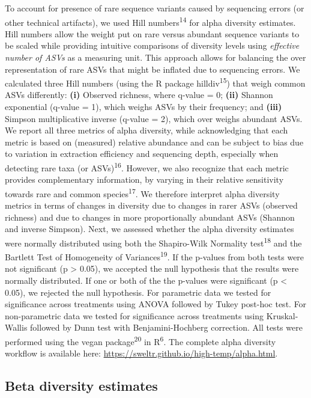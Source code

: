 \documentclass[
  10pt,
  letterpaper,
  DIV=11,
  numbers=noendperiod]{scrartcl}
\begin{document}
To account for presence of rare sequence variants caused by sequencing
errors (or other technical artifacts), we used Hill
numbers\textsuperscript{14} for alpha diversity estimates. Hill numbers
allow the weight put on rare versus abundant sequence variants to be
scaled while providing intuitive comparisons of diversity levels using
\emph{effective number of ASVs} as a measuring unit. This approach
allows for balancing the over representation of rare ASVs that might be
inflated due to sequencing errors. We calculated three Hill numbers
(using the R package hilldiv\textsuperscript{15}) that weigh common ASVs
differently: \textbf{(i)} Observed richness, where q-value = 0;
\textbf{(ii)} Shannon exponential (q-value = 1), which weighs ASVs by
their frequency; and \textbf{(iii)} Simpson multiplicative inverse
(q-value = 2), which over weighs abundant ASVs. We report all three
metrics of alpha diversity, while acknowledging that each metric is
based on (measured) relative abundance and can be subject to bias due to
variation in extraction efficiency and sequencing depth, especially when
detecting rare taxa (or ASVs)\textsuperscript{16}. However, we also
recognize that each metric provides complementary information, by
varying in their relative sensitivity towards rare and common
species\textsuperscript{17}. We therefore interpret alpha diversity
metrics in terms of changes in diversity due to changes in rarer ASVs
(observed richness) and due to changes in more proportionally abundant
ASVs (Shannon and inverse Simpson). Next, we assessed whether the alpha
diversity estimates were normally distributed using both the
Shapiro-Wilk Normality test\textsuperscript{18} and the Bartlett Test of
Homogeneity of Variances\textsuperscript{19}. If the p-values from both
tests were not significant (p \textgreater{} 0.05), we accepted the null
hypothesis that the results were normally distributed. If one or both of
the the p-values were significant (p \textless{} 0.05), we rejected the
null hypothesis. For parametric data we tested for significance across
treatments using ANOVA followed by Tukey post-hoc test. For
non-parametric data we tested for significance across treatments using
Kruskal-Wallis followed by Dunn test with Benjamini-Hochberg correction.
All tests were performed using the vegan package\textsuperscript{20} in
R\textsuperscript{6}. The complete alpha diversity workflow is available
here: \url{https://sweltr.github.io/high-temp/alpha.html}.

\hypertarget{beta-diversity-estimates}{%
\subsection{Beta diversity estimates}\label{beta-diversity-estimates}}
\end{document}
